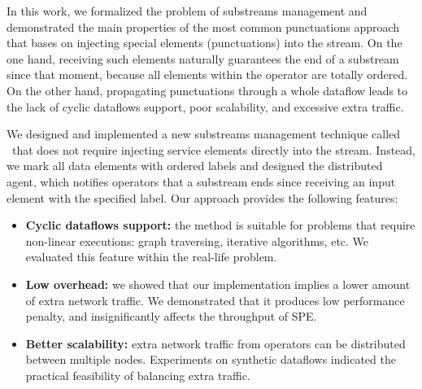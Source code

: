 In this work, we formalized the problem of substreams management and demonstrated the main properties of the most common punctuations approach that bases on injecting special elements (punctuations) into the stream. On the one hand, receiving such elements naturally guarantees the end of a substream since that moment, because all elements within the operator are totally ordered. On the other hand, propagating punctuations through a whole dataflow leads to the lack of cyclic dataflows support, poor scalability, and excessive extra traffic.

We designed and implemented a new substreams management technique called \tracker\ that does not require injecting service elements directly into the stream. Instead, we mark all data elements with ordered labels and designed the distributed agent, which notifies operators that a substream ends since receiving an input element with the specified label. Our approach provides the following features:

\begin{itemize}
     \item {\bf Cyclic dataflows support:} the method is suitable for problems that require non-linear executions: graph traversing, iterative algorithms, etc. We evaluated this feature within the real-life problem.
     \item {\bf Low overhead:} we showed that our implementation implies a lower amount of extra network traffic. We demonstrated that it produces low performance penalty, and insignificantly affects the throughput of SPE.
     \item {\bf Better scalability:} extra network traffic from operators can be distributed between multiple nodes. Experiments on synthetic dataflows indicated the practical feasibility of balancing extra traffic.
\end{itemize}



